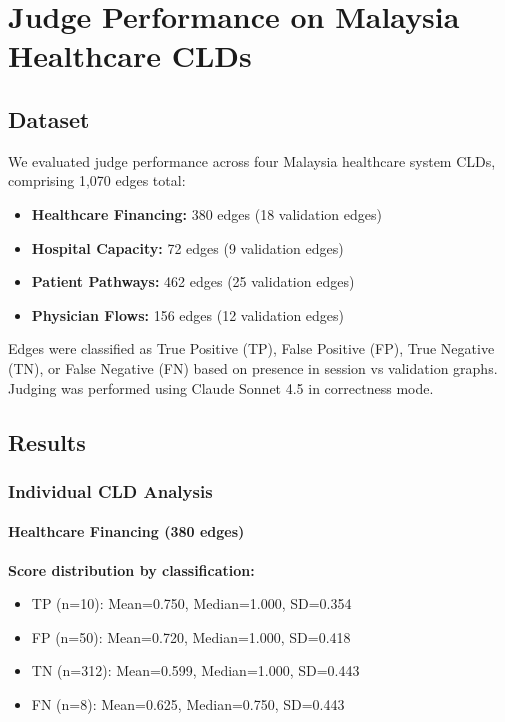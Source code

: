 \chapter{Judge Performance on Malaysia Healthcare CLDs}
\label{ch:rq1_malaysia_results}

\section{Dataset}

We evaluated judge performance across four Malaysia healthcare system CLDs, comprising 1,070 edges total:

\begin{itemize}
    \item \textbf{Healthcare Financing:} 380 edges (18 validation edges)
    \item \textbf{Hospital Capacity:} 72 edges (9 validation edges)
    \item \textbf{Patient Pathways:} 462 edges (25 validation edges)
    \item \textbf{Physician Flows:} 156 edges (12 validation edges)
\end{itemize}

Edges were classified as True Positive (TP), False Positive (FP), True Negative (TN), or False Negative (FN) based on presence in session vs validation graphs. Judging was performed using Claude Sonnet 4.5 in correctness mode.

\section{Results}

\subsection{Individual CLD Analysis}

\subsubsection{Healthcare Financing (380 edges)}

\textbf{Score distribution by classification:}
\begin{itemize}
    \item TP (n=10): Mean=0.750, Median=1.000, SD=0.354
    \item FP (n=50): Mean=0.720, Median=1.000, SD=0.418
    \item TN (n=312): Mean=0.599, Median=1.000, SD=0.443
    \item FN (n=8): Mean=0.625, Median=0.750, SD=0.443
\end{itemize}

